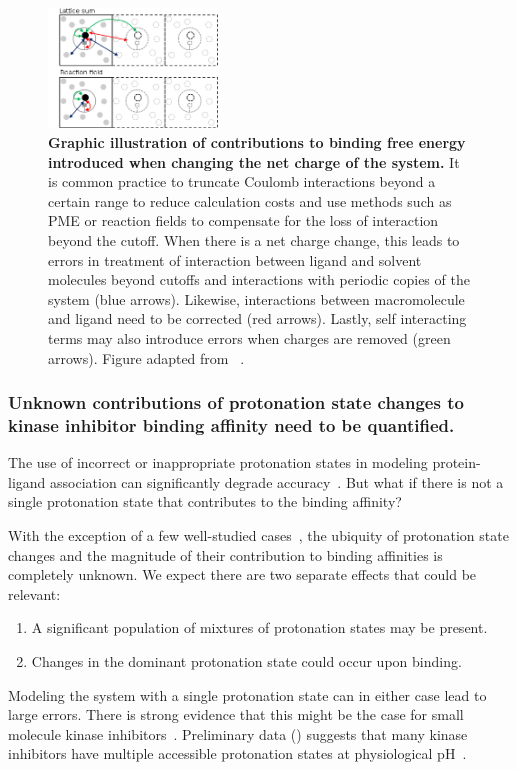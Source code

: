 \documentclass[10pt,final]{article}
\newcommand{\pH}{p$\mathrm{H}$\ }
\begin{document}
\begin{figure}[H]
  \centering
  \includegraphics[width=0.4\textwidth]{figures/reif_oostenbrink.png}
    \caption{\textbf{Graphic illustration of contributions to binding free energy introduced when changing the net charge of the system.}  It is common practice to truncate Coulomb interactions beyond a certain range to reduce calculation costs and use methods such as PME or reaction fields to compensate for the loss of interaction beyond the cutoff. When there is a net charge change, this leads to errors in treatment of interaction between ligand and solvent molecules beyond cutoffs and interactions with periodic copies of the system (blue arrows). Likewise, interactions between macromolecule and ligand need to be corrected (red arrows). Lastly, self interacting terms may also introduce errors when charges are removed (green arrows). Figure adapted from ~\textcite{Reif2013a}.}
  \label{figure:chargecorrections}
\end{figure}

\subsubsection*{Unknown contributions of protonation state changes to kinase inhibitor binding affinity need to be quantified.}
The use of incorrect or inappropriate protonation states in modeling protein-ligand association can significantly degrade accuracy~\autocite{Polgar2005a,Wittayanarakul2008a}.
But what if there is not a single protonation state that contributes to the binding affinity?

With the exception of a few well-studied cases~\autocite{Dullweber2001a,Aleksandrov2007a,Czodrowski2007a,Steuber2007a,Czodrowski2007b}, 
the ubiquity of protonation state changes and the magnitude of their contribution to binding affinities is completely unknown. 
%
We expect there are two separate effects that could be relevant:
\begin{enumerate}
 \item A significant population of mixtures of protonation states may be present.
 \item Changes in the dominant protonation state could occur upon binding.
\end{enumerate}
%
Modeling the system with a single protonation state can in either case lead to large errors.
%
There is strong evidence that this might be the case for small molecule kinase inhibitors~\autocite{Szakacs2005a,Seeliger2007a,Lin2013a}. 
%
Preliminary data () suggests that many kinase inhibitors have multiple accessible protonation states at physiological \pH.
%
\end{document}
